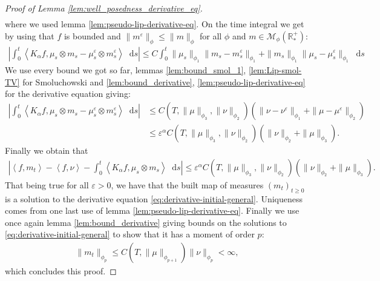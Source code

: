 \documentclass[11pt,a4paper]{article}
\newcommand{\RRP}{\mathbb{R}^+_*}
\newcommand{\MC}{\mathcal{M}}
\newcommand{\Proc}[1]{\left(#1\right)_{t\geq 0}}
\newcommand{\brac}[1]{\left\langle#1\right\rangle}
\newcommand{\dd}{\mathop{}\!\mathrm{d}}
\begin{document}
\begin{proof}[Proof of Lemma \ref{lem:well_posedness_derivative_eq}]
\begin{align*}
    \end{align*}
    where we used lemma \ref{lem:pseudo-lip-derivative-eq}. On the time integral we get by using that $f$ is bounded and $\|m^\varepsilon\|_{\phi} \leq \|m\|_\phi$ for all $\phi$ and $m \in \MC_{\phi}(\RRP)$:
    \begin{align*}
        \left|\int_0^t \brac{K_\alpha f,\mu_s \otimes m_s - \mu^\varepsilon_s \otimes m^\varepsilon_s} \dd s\right| 
        \leq C\int_0^t \|\mu_s\|_{\phi_1} \|m_s - m_s^\varepsilon\|_{\phi_1}+ \|m_s\|_{\phi_1} \|\mu_s - \mu_s^\varepsilon\|_{\phi_1}\dd s 
    \end{align*}
    We use every bound we got so far, lemmas \ref{lem:bound_smol_1}, \ref{lem:Lip-smol-TV} for Smoluchowski and \ref{lem:bound_derivative}, \ref{lem:pseudo-lip-derivative-eq} for the derivative equation giving:
    \begin{align*}
        \left|\int_0^t \brac{K_\alpha f,\mu_s \otimes m_s - \mu^\varepsilon_s \otimes m^\varepsilon_s} \dd s\right| 
        &\leq C(T,\|\mu\|_{\phi_3},\|\nu\|_{\phi_2})\left(\| \nu - \nu^\varepsilon\|_{\phi_1} + \| \mu - \mu^\varepsilon\|_{\phi_2}\right)\\
        &\leq \varepsilon^\alpha C(T,\|\mu\|_{\phi_3},\|\nu\|_{\phi_2})\left(\| \nu \|_{\phi_2} + \| \mu \|_{\phi_3}\right).
    \end{align*}
    Finally we obtain that 
    \begin{align*}
        \left| \brac{f,m_t} - \brac{f,\nu} - \int_0^t \brac{K_\alpha f,\mu_s \otimes m_s} \dd s\right| \leq \varepsilon^\alpha C(T,\|\mu\|_{\phi_3},\|\nu\|_{\phi_2})\left(\| \nu \|_{\phi_2} + \| \mu \|_{\phi_3}\right).
    \end{align*}
    That being true for all $\varepsilon > 0$, we have that the built map of measures $\Proc{m_t}$ is a solution to the derivative equation \eqref{eq:derivative-initial-general}. Uniqueness comes from one last use of lemma \ref{lem:pseudo-lip-derivative-eq}. Finally we use once again lemma \ref{lem:bound_derivative} giving bounds on the solutions to \eqref{eq:derivative-initial-general} to show that it has a moment of order $p$:
    \begin{align*}
        \| m_t \|_{\phi_p} \leq C(T,\|\mu\|_{\phi_{p+1}})\|\nu\|_{\phi_p} < \infty,
    \end{align*}
    which concludes this proof.
\end{proof}
\end{document}
